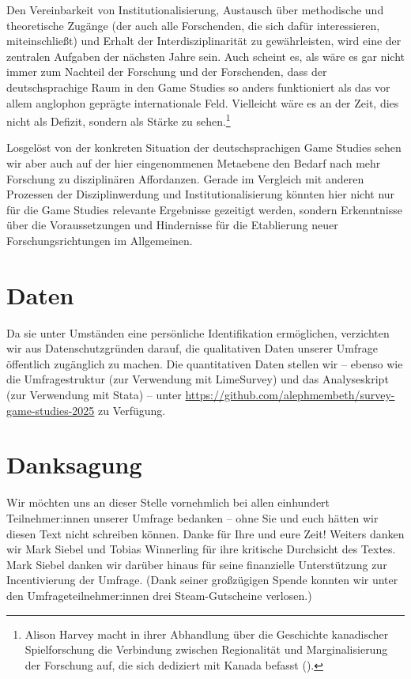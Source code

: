 \documentclass{scrartcl}
\begin{document}
Den Vereinbarkeit von Institutionalisierung, Austausch über methodische und theoretische Zugänge (der auch alle Forschenden, die sich dafür interessieren, miteinschließt) und Erhalt der Interdisziplinarität zu gewährleisten, wird eine der zentralen Aufgaben der nächsten Jahre sein.
Auch scheint es, als wäre es gar nicht immer zum Nachteil der Forschung und der Forschenden, dass der deutschsprachige Raum in den Game Studies so anders funktioniert als das vor allem anglophon geprägte internationale Feld.
Vielleicht wäre es an der Zeit, dies nicht als Defizit, sondern als Stärke zu sehen.\footnote{Alison Harvey macht in ihrer Abhandlung über die Geschichte kanadischer Spielforschung die Verbindung zwischen Regionalität und Marginalisierung der Forschung auf, die sich dediziert mit Kanada befasst (\autocite[vgl.][]{harvey_enquotetheres_2025}).}

Losgelöst von der konkreten Situation der deutschsprachigen Game Studies sehen wir aber auch auf der hier eingenommenen Metaebene den Bedarf nach mehr Forschung zu disziplinären Affordanzen.
Gerade im Vergleich mit anderen Prozessen der Disziplinwerdung und Institutionalisierung könnten hier nicht nur für die Game Studies relevante Ergebnisse gezeitigt werden, sondern Erkenntnisse über die Voraussetzungen und Hindernisse für die Etablierung neuer Forschungsrichtungen im Allgemeinen.


\clearpage
\section*{Daten}
Da sie unter Umständen eine persönliche Identifikation ermöglichen, verzichten wir aus Datenschutzgründen darauf, die qualitativen Daten unserer Umfrage öffentlich zugänglich zu machen.
Die quantitativen Daten stellen wir -- ebenso wie die Umfragestruktur (zur Verwendung mit LimeSurvey) und das Analyseskript (zur Verwendung mit Stata) -- unter \url{https://github.com/alephmembeth/survey-game-studies-2025} zu Verfügung.


\section*{Danksagung}
Wir möchten uns an dieser Stelle vornehmlich bei allen einhundert Teilnehmer:innen unserer Umfrage bedanken -- ohne Sie und euch hätten wir diesen Text nicht schreiben können.
Danke für Ihre und eure Zeit!
Weiters danken wir Mark Siebel und Tobias Winnerling für ihre kritische Durchsicht des Textes.
Mark Siebel danken wir darüber hinaus für seine finanzielle Unterstützung zur Incentivierung der Umfrage.
(Dank seiner großzügigen Spende konnten wir unter den Umfrageteilnehmer:innen drei Steam-Gutscheine verlosen.)
\end{document}
